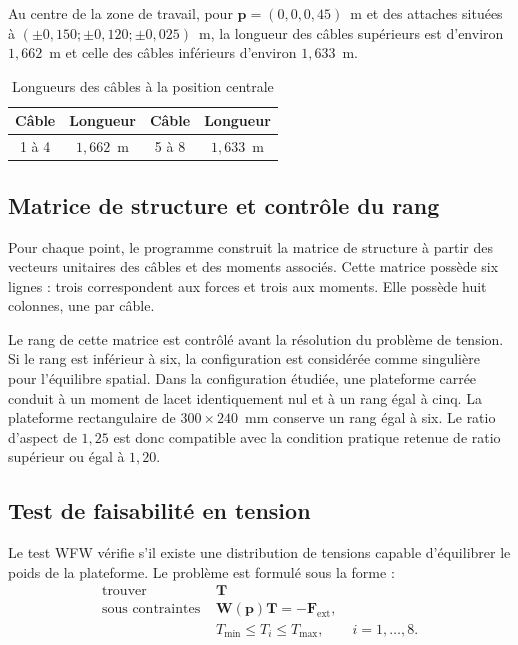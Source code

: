 Au centre de la zone de travail, pour $\mathbf{p}=(0,0,0{,}45)$~m et des attaches situées à $\left(\pm0{,}150;\pm0{,}120;\pm0{,}025\right)$~m, la longueur des câbles supérieurs est d'environ $1{,}662$~m et celle des câbles inférieurs d'environ $1{,}633$~m.

\begin{table}[H]
\centering
\caption{Longueurs des câbles à la position centrale}
\label{tab:longueurs_centre}
\begin{tabular}{|c|c|c|c|}
\hline
\textbf{Câble} & \textbf{Longueur} & \textbf{Câble} & \textbf{Longueur} \\
\hline
1 à 4 & $1{,}662$~m & 5 à 8 & $1{,}633$~m \\
\hline
\end{tabular}
\end{table}

\subsection{Matrice de structure et contrôle du rang}

Pour chaque point, le programme construit la matrice de structure à partir des vecteurs unitaires des câbles et des moments associés. Cette matrice possède six lignes : trois correspondent aux forces et trois aux moments. Elle possède huit colonnes, une par câble.

Le rang de cette matrice est contrôlé avant la résolution du problème de tension. Si le rang est inférieur à six, la configuration est considérée comme singulière pour l'équilibre spatial. Dans la configuration étudiée, une plateforme carrée conduit à un moment de lacet identiquement nul et à un rang égal à cinq. La plateforme rectangulaire de $300\times240$~mm conserve un rang égal à six. Le ratio d'aspect de $1{,}25$ est donc compatible avec la condition pratique retenue de ratio supérieur ou égal à $1{,}20$.

\subsection{Test de faisabilité en tension}

Le test WFW vérifie s'il existe une distribution de tensions capable d'équilibrer le poids de la plateforme. Le problème est formulé sous la forme :
\begin{equation}
\begin{aligned}
\text{trouver } &\mathbf{T} \\
\text{sous contraintes } &\mathbf{W}(\mathbf{p})\mathbf{T}=-\mathbf{F}_{\mathrm{ext}},\\
&T_{\min}\leq T_i\leq T_{\max},\qquad i=1,\ldots,8.
\end{aligned}
\label{eq:wfw_tandem}
\end{equation}

